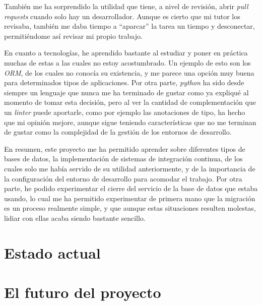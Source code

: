 También me ha sorprendido la utilidad que tiene, a nivel de revisión, abrir \textit{pull requests} cuando solo hay un desarrollador. Aunque es cierto que mi tutor los revisaba, también me daba tiempo a ``aparcar'' la tarea un tiempo y desconectar, permitiéndome así revisar mi propio trabajo.

En cuanto a tecnologías, he aprendido bastante al estudiar y poner en práctica muchas de estas a las cuales no estoy acostumbrado. Un ejemplo de esto son los \textit{ORM}, de los cuales no conocía su existencia, y me parece una opción muy buena para determinados tipos de aplicaciones. Por otra parte, \textit{python} ha sido desde siempre un lenguaje que nunca me ha terminado de gustar como ya expliqué al momento de tomar esta decisión, pero al ver la cantidad de complementación que un \textit{linter} puede aportarle, como por ejemplo las anotaciones de tipo, ha hecho que mi opinión mejore, aunque sigue teniendo características que no me terminan de gustar como la complejidad de la gestión de los entornos de desarrollo.

En resumen, este proyecto me ha permitido aprender sobre diferentes tipos de bases de datos, la implementación de sistemas de integración continua, de los cuales solo me había servido de su utilidad anteriormente, y de la importancia de la configuración del entorno de desarrollo para acomodar el trabajo. Por otra parte, he podido experimentar el cierre del servicio de la base de datos que estaba usando, lo cual me ha permitido experimentar de primera mano que la migración es un proceso realmente simple, y que aunque estas situaciones resulten molestas, lidiar con ellas acaba siendo bastante sencillo.

\section{Estado actual}

\section{El futuro del proyecto}
